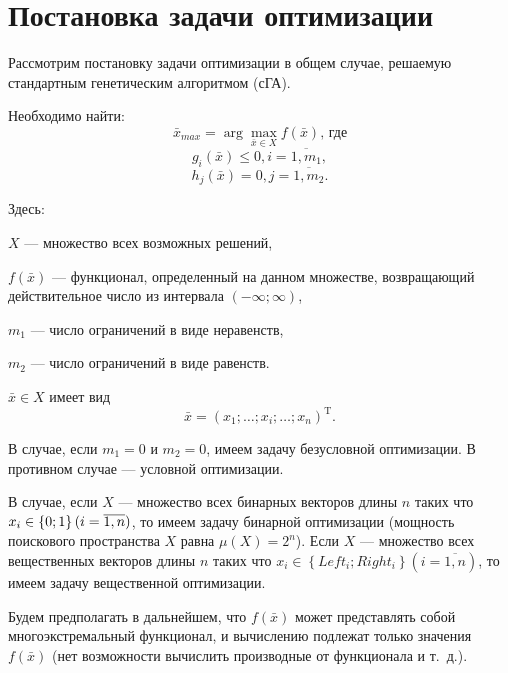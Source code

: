 \chapter{Постановка задачи оптимизации}\label{StandardGA:section_problemoptimization}

Рассмотрим постановку задачи оптимизации в общем случае, решаемую стандартным генетическим алгоритмом (сГА).

Необходимо найти:
\begin{equation}
\label{StandardGA:eq:problemoptimization}
\bar{x}_{max} = \arg{ \max_{\bar{x} \in X}{f\left ( \bar{x} \right )} }\text {, где}
\end{equation}
\begin{equation*}
g_i\left (\bar{x}\right )\leq 0, i=\overline{1,m_1},
\end{equation*}
\begin{equation*}
h_j\left (\bar{x}\right )= 0, j=\overline{1,m_2}.
\end{equation*}

Здесь:

$ X $ --- множество всех возможных решений,

$ f\left ( \bar{x} \right ) $ --- функционал, определенный на данном множестве, возвращающий действительное число из интервала $ (-\infty;\infty) $,

$ m_1 $ --- число ограничений в виде неравенств,

$ m_2 $ --- число ограничений в виде равенств.

$ \bar{x} \in X $ имеет вид 
\begin{equation}
\label{StandardGA:eq:formofvector}
\bar{x}={\left(x_1;\dots;x_i;\dots;x_n \right)}^\mathrm{T}.
\end{equation}

В случае, если $ m_1=0 $ и $ m_2=0 $, имеем задачу безусловной оптимизации. В противном случае --- условной оптимизации.

В случае, если $ X $ --- множество всех бинарных векторов длины $ n $ таких что $ x_i\in\left\lbrace 0;1\right\rbrace  (i\hm=\overline{1,n})$, то имеем задачу бинарной оптимизации (мощность поискового пространства $ X $ равна $ \mu(X)=2^n $). Если $ X $ --- множество всех вещественных векторов длины $ n $ таких что $ x_i\in\left\lbrace Left_i;Right_i\right\rbrace (i=\overline{1,n}) $, то имеем задачу вещественной оптимизации.

Будем предполагать в дальнейшем, что $ f(\bar{x}) $ может представлять собой  многоэкстремальный функционал, и вычислению подлежат только значения $ f(\bar{x}) $ (нет возможности вычислить производные от функционала и т.~д.).

